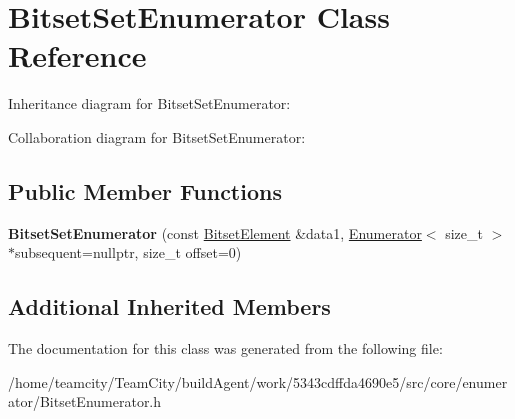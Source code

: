 \hypertarget{classBitsetSetEnumerator}{}\section{Bitset\+Set\+Enumerator Class Reference}
\label{classBitsetSetEnumerator}


Inheritance diagram for Bitset\+Set\+Enumerator\+:


Collaboration diagram for Bitset\+Set\+Enumerator\+:
\subsection*{Public Member Functions}
\begin{DoxyCompactItemize}
\item 
{\bfseries Bitset\+Set\+Enumerator} (const \hyperlink{classBitsetElement}{Bitset\+Element} \&data1, \hyperlink{classEnumerator}{Enumerator}$<$ size\+\_\+t $>$ $\ast$subsequent=nullptr, size\+\_\+t offset=0)\hypertarget{classBitsetSetEnumerator_a0edfcef06f94f81e2faf8ad9eca0c791}{}\label{classBitsetSetEnumerator_a0edfcef06f94f81e2faf8ad9eca0c791}

\end{DoxyCompactItemize}
\subsection*{Additional Inherited Members}


The documentation for this class was generated from the following file\+:\begin{DoxyCompactItemize}
\item 
/home/teamcity/\+Team\+City/build\+Agent/work/5343cdffda4690e5/src/core/enumerator/Bitset\+Enumerator.\+h\end{DoxyCompactItemize}
